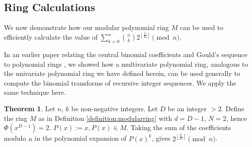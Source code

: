 \documentclass{article}
\theoremstyle{plain}
\theoremstyle{definition}
\newtheorem{theorem}{Theorem}
\begin{document}
\subsection{Ring Calculations}
We now demonstrate how our modular polynomial ring $M$ can be used to efficiently calculate the value of $\sum_{k=0}^{n} \binom{n}{k} 2^{\left\lfloor \frac{k}{D} \right\rfloor} \pmod{n}$.

In an earlier paper relating the central binomial coefficients and Gould's sequence to polynomial rings \cite{shunia2023polynomial}, we showed how a multivariate polynomial ring, analogous to the univariate polynomial ring we have defined herein, can be used generally to compute the binomial transforms of recursive integer sequences. We apply the same technique here.

\begin{theorem} \label{theorem:2}
Let $n$, $k$ be non-negative integers. Let $D$ be an integer $>2$. Define the ring $M$ as in Definition \ref{definition:modularring} with $d=D-1$, $N=2$, hence $\Phi(x^{D-1}) = 2$. $P(x) := x, P(x) \in M$. Taking the sum of the coefficients modulo $n$ in the polynomial expansion of \( P(x)^k \), gives $2^{\left\lfloor \frac{k}{D} \right\rfloor} \pmod{n}$.
\end{theorem}
\end{document}

